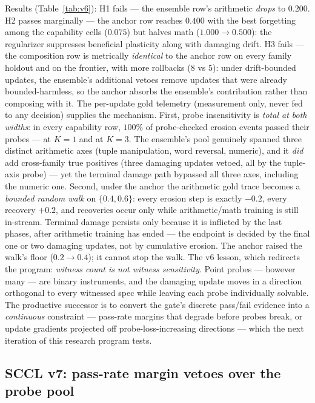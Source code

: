 \documentclass[10pt,conference]{IEEEtran}
\begin{document}
Results (Table~\ref{tab:v6}): H1 fails --- the ensemble row's arithmetic \emph{drops} to $0.200$. H2 passes marginally --- the anchor row reaches $0.400$ with the best forgetting among the capability cells ($0.075$) but halves math ($1.000\to0.500$): the regularizer suppresses beneficial plasticity along with damaging drift. H3 fails --- the composition row is metrically \emph{identical} to the anchor row on every family holdout and on the frontier, with more rollbacks ($8$ vs $5$): under drift-bounded updates, the ensemble's additional vetoes remove updates that were already bounded-harmless, so the anchor absorbs the ensemble's contribution rather than composing with it. The per-update gold telemetry (measurement only, never fed to any decision) supplies the mechanism. First, probe insensitivity is \emph{total at both widths}: in every capability row, $100\%$ of probe-checked erosion events passed their probes --- at $K=1$ and at $K=3$. The ensemble's pool genuinely spanned three distinct arithmetic axes (tuple manipulation, word reversal, numeric), and it \emph{did} add cross-family true positives (three damaging updates vetoed, all by the tuple-axis probe) --- yet the terminal damage path bypassed all three axes, including the numeric one. Second, under the anchor the arithmetic gold trace becomes a \emph{bounded random walk} on $\{0.4, 0.6\}$: every erosion step is exactly $-0.2$, every recovery $+0.2$, and recoveries occur only while arithmetic/math training is still in-stream. Terminal damage persists only because it is inflicted by the last phases, after arithmetic training has ended --- the endpoint is decided by the final one or two damaging updates, not by cumulative erosion. The anchor raised the walk's floor ($0.2\to0.4$); it cannot stop the walk. The v6 lesson, which redirects the program: \emph{witness count is not witness sensitivity}. Point probes --- however many --- are binary instruments, and the damaging update moves in a direction orthogonal to every witnessed spec while leaving each probe individually solvable. The productive successor is to convert the gate's discrete pass/fail evidence into a \emph{continuous} constraint --- pass-rate margins that degrade before probes break, or update gradients projected off probe-loss-increasing directions --- which the next iteration of this research program tests.

\subsection*{SCCL v7: pass-rate margin vetoes over the probe pool}
\label{sec:v7}
\end{document}
